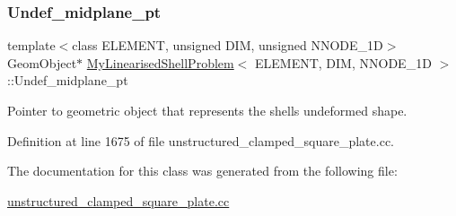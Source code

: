 \subsubsection{\texorpdfstring{Undef\+\_\+midplane\+\_\+pt}{Undef\_midplane\_pt}}
{\footnotesize\ttfamily template$<$class E\+L\+E\+M\+E\+NT, unsigned D\+IM, unsigned N\+N\+O\+D\+E\+\_\+1D$>$ \\
Geom\+Object$\ast$ \hyperlink{classMyLinearisedShellProblem}{My\+Linearised\+Shell\+Problem}$<$ E\+L\+E\+M\+E\+NT, D\+IM, N\+N\+O\+D\+E\+\_\+1D $>$\+::Undef\+\_\+midplane\+\_\+pt\hspace{0.3cm}{\ttfamily [private]}}



Pointer to geometric object that represents the shell\textquotesingle{}s undeformed shape. 



Definition at line 1675 of file unstructured\+\_\+clamped\+\_\+square\+\_\+plate.\+cc.



The documentation for this class was generated from the following file\+:\begin{DoxyCompactItemize}
\item 
\hyperlink{unstructured__clamped__square__plate_8cc}{unstructured\+\_\+clamped\+\_\+square\+\_\+plate.\+cc}\end{DoxyCompactItemize}
